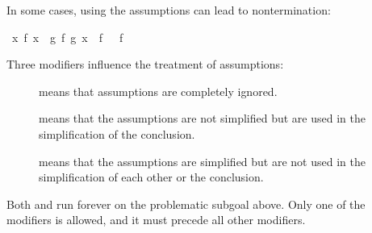 \begin{isabellebody}
\begin{isamarkuptext}
In some cases, using the assumptions can lead to nontermination:%
\end{isamarkuptext}%
\isamarkuptrue%
\ {\isachardoublequote}{\isasymforall}x{\isachardot}\ f\ x\ {\isacharequal}\ g\ {\isacharparenleft}f\ {\isacharparenleft}g\ x{\isacharparenright}{\isacharparenright}\ {\isasymLongrightarrow}\ f\ {\isacharbrackleft}{\isacharbrackright}\ {\isacharequal}\ f\ {\isacharbrackleft}{\isacharbrackright}\ {\isacharat}\ {\isacharbrackleft}{\isacharbrackright}{\isachardoublequote}\isamarkupfalse%
\isamarkuptrue%
\isamarkupfalse%
\isamarkupfalse%
%
\begin{isamarkuptext}%
\noindent
Three modifiers influence the treatment of assumptions:
\begin{description}
\item[]
 means that assumptions are completely ignored.
\item[]
 means that the assumptions are not simplified but
  are used in the simplification of the conclusion.
\item[]
 means that the assumptions are simplified but are not
  used in the simplification of each other or the conclusion.
\end{description}
Both  and  run forever on
the problematic subgoal above.
Only one of the modifiers is allowed, and it must precede all
other modifiers.
\end{isamarkuptext}%
\isamarkuptrue%
%
\end{isabellebody}
